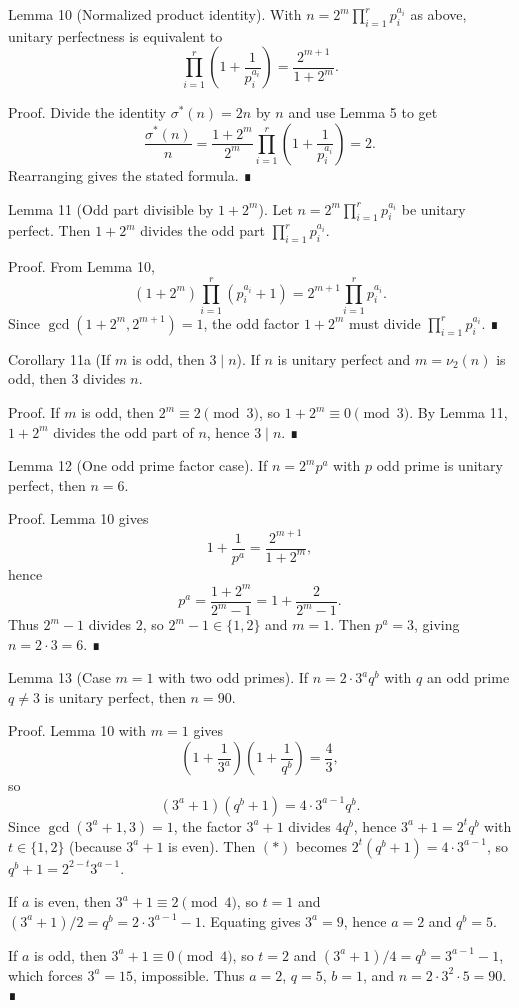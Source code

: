 Lemma 10 (Normalized product identity).
With $n=2^m \prod_{i=1}^r p_i^{a_i}$ as above, unitary perfectness is equivalent to
\[
\prod_{i=1}^r \left(1+\frac{1}{p_i^{a_i}}\right)=\frac{2^{m+1}}{1+2^m}.
\]

Proof.
Divide the identity $\sigma^*(n)=2n$ by $n$ and use Lemma 5 to get
\[
\frac{\sigma^*(n)}{n} = \frac{1+2^m}{2^m}\prod_{i=1}^r \left(1+\frac{1}{p_i^{a_i}}\right)=2.
\]
Rearranging gives the stated formula. ∎

Lemma 11 (Odd part divisible by $1+2^m$).
Let $n=2^m \prod_{i=1}^r p_i^{a_i}$ be unitary perfect. Then $1+2^m$ divides
the odd part $\prod_{i=1}^r p_i^{a_i}$.

Proof.
From Lemma 10,
\[
(1+2^m)\prod_{i=1}^r (p_i^{a_i}+1)=2^{m+1}\prod_{i=1}^r p_i^{a_i}.
\]
Since $\gcd(1+2^m,2^{m+1})=1$, the odd factor $1+2^m$ must divide
$\prod_{i=1}^r p_i^{a_i}$. ∎

Corollary 11a (If $m$ is odd, then $3\mid n$).
If $n$ is unitary perfect and $m=\nu_2(n)$ is odd, then $3$ divides $n$.

Proof.
If $m$ is odd, then $2^m\equiv 2 \pmod{3}$, so $1+2^m\equiv 0 \pmod{3}$.
By Lemma 11, $1+2^m$ divides the odd part of $n$, hence $3\mid n$. ∎

Lemma 12 (One odd prime factor case).
If $n=2^m p^a$ with $p$ odd prime is unitary perfect, then $n=6$.

Proof.
Lemma 10 gives
\[
1+\frac{1}{p^a}=\frac{2^{m+1}}{1+2^m},
\]
hence
\[
p^a=\frac{1+2^m}{2^m-1}=1+\frac{2}{2^m-1}.
\]
Thus $2^m-1$ divides $2$, so $2^m-1\in\{1,2\}$ and $m=1$.
Then $p^a=3$, giving $n=2\cdot 3=6$. ∎

Lemma 13 (Case $m=1$ with two odd primes).
If $n=2\cdot 3^a q^b$ with $q$ an odd prime $q\ne 3$ is unitary perfect, then $n=90$.

Proof.
Lemma 10 with $m=1$ gives
\[
\left(1+\frac{1}{3^a}\right)\left(1+\frac{1}{q^b}\right)=\frac{4}{3},
\]
so
\[
(3^a+1)(q^b+1)=4\cdot 3^{a-1} q^b. \tag{*}
\]
Since $\gcd(3^a+1,3)=1$, the factor $3^a+1$ divides $4q^b$, hence
$3^a+1=2^t q^b$ with $t\in\{1,2\}$ (because $3^a+1$ is even).
Then $(*)$ becomes $2^t(q^b+1)=4\cdot 3^{a-1}$, so
$q^b+1=2^{2-t}3^{a-1}$.

If $a$ is even, then $3^a+1\equiv 2\pmod{4}$, so $t=1$ and
$(3^a+1)/2=q^b=2\cdot 3^{a-1}-1$.
Equating gives $3^a=9$, hence $a=2$ and $q^b=5$.

If $a$ is odd, then $3^a+1\equiv 0\pmod{4}$, so $t=2$ and
$(3^a+1)/4=q^b=3^{a-1}-1$, which forces $3^a=15$, impossible.
Thus $a=2$, $q=5$, $b=1$, and $n=2\cdot 3^2\cdot 5=90$. ∎

